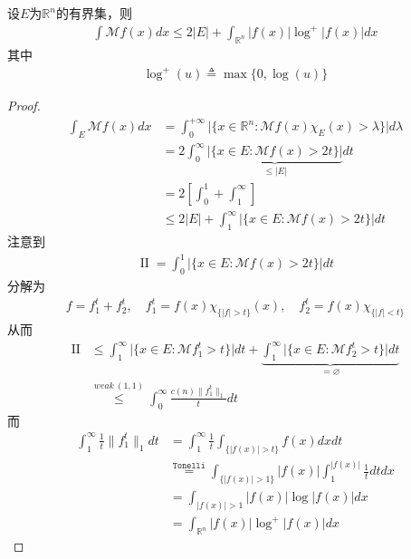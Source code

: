 \begin{theorem}
    设$E$为$\mathbb{R}^n$的有界集，则
    \begin{align*}
        \int\mathcal{M} f(x) dx \leqslant 2|E| + \int_{\mathbb{R}^n} |f(x)| \log^+ |f(x)| dx
    \end{align*}
    其中
    \begin{align*}
        \log^+ (u) \triangleq \max\{0, \log(u)\}
    \end{align*}
    
\end{theorem}
\begin{proof}
    \begin{align*}
        \int_E \mathcal{M} f(x) dx &= \int_0^{+\infty} \bigg|\{x\in\mathbb{R}^n : \mathcal{M} f(x) \chi_E(x) > \lambda\}\bigg| d\lambda \\
        & = 2 \int_0^{\infty} \underbrace{\bigg|\{x\in E: \mathcal{M} f(x) > 2t \} \bigg|}\limits_{\leqslant |E|} dt \\
        & = 2\left[\int_0^1 + \int_1^{\infty} \right] \\
        & \leqslant 2|E| + \int_1^{\infty} \bigg|\{x\in E: \mathcal{M} f(x) > 2t\}\bigg| dt
    \end{align*}
    注意到
    \begin{align*}
        \operatorname{II} = \int_0^1 \bigg|\{ x\in E: \mathcal{M} f(x) > 2t\} \bigg| dt 
    \end{align*}
    分解为
    \begin{align*}
        f = f_1^t + f_2^t, \quad f_1^t=f(x)\chi_{\{|f|>t\}} (x),\quad f_2^t = f(x) \chi_{\{|f|<t\}}
    \end{align*}
从而
\begin{align*}
    \operatorname{II} &\leqslant \int_1^{\infty} \bigg|\{x\in E: \mathcal{M} f_1^t > t\} \bigg| dt + \underbrace{\int_1^{\infty} \bigg|\{x\in E: \mathcal{M} f_2^t > t\} \bigg| dt}\limits_{= \varnothing} \\
    & \overset{weak\ (1,1)}{\leqslant } \int_0^{\infty} \frac{c(n) \|f_1^t\|_1}{t} dt  
\end{align*}
而
\begin{align*}
    \int_1^{\infty} \frac{1}{t} \|f_1^t\|_1 dt & = \int_1^{\infty} \frac{1}{t} \int_{\{|f(x)| > t\}} f(x) dx dt \\
    & \overset{\texttt{Tonelli}}{=} \int_{\{|f(x)| > 1\}} |f(x)| \int_1^{|f(x)|} \frac{1}{t} dt dx \\
    & = \int_{|f(x)| > 1} |f(x)| \log |f(x)| dx \\
    & = \int_{\mathbb{R}^n} |f(x)| \log^+ |f(x)| dx
\end{align*}
\end{proof}


